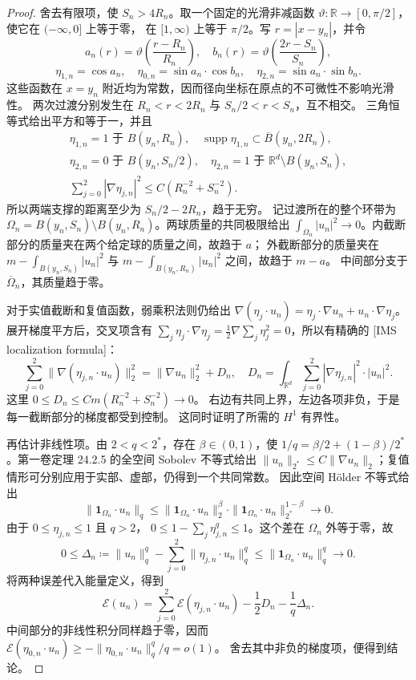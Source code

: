 \begin{proof}
舍去有限项，使 \(S_n>4R_n\)。取一个固定的光滑非减函数
\(\vartheta\colon\mathbb R\to[0,\pi/2]\)，使它在 \((-\infty,0]\) 上等于零，
在 \([1,\infty)\) 上等于 \(\pi/2\)。写 \(r=|x-y_n|\)，并令
\[
 a_n(r)=\vartheta\!\left(\frac{r-R_n}{R_n}\right),\quad
 b_n(r)=\vartheta\!\left(\frac{2r-S_n}{S_n}\right),
\]
\[
 \eta_{1,n}=\cos a_n,\quad
 \eta_{0,n}=\sin a_n\cdot\cos b_n,\quad
 \eta_{2,n}=\sin a_n\cdot\sin b_n.
\]
这些函数在 \(x=y_n\) 附近均为常数，因而径向坐标在原点的不可微性不影响光滑性。
两次过渡分别发生在 \(R_n<r<2R_n\) 与 \(S_n/2<r<S_n\)，互不相交。
三角恒等式给出平方和等于一，并且
\[
 \begin{gathered}
 \eta_{1,n}=1\text{ 于 }B(y_n,R_n),\quad
 \operatorname{supp}\eta_{1,n}\subset\overline B(y_n,2R_n),\\
 \eta_{2,n}=0\text{ 于 }B(y_n,S_n/2),\quad
 \eta_{2,n}=1\text{ 于 }\mathbb R^d\setminus B(y_n,S_n),\\
 \sum_{j=0}^2|\nabla\eta_{j,n}|^2
 \le C(R_n^{-2}+S_n^{-2}).
 \end{gathered}
\]
所以两端支撑的距离至少为 \(S_n/2-2R_n\)，趋于无穷。
记过渡所在的整个环带为
\(\Omega_n=B(y_n,S_n)\setminus B(y_n,R_n)\)。两球质量的共同极限给出
\(\int_{\Omega_n}|u_n|^2\to0\)。内截断部分的质量夹在两个给定球的质量之间，故趋于 \(a\)；
外截断部分的质量夹在 \(m-\int_{B(y_n,S_n)}|u_n|^2\) 与
\(m-\int_{B(y_n,R_n)}|u_n|^2\) 之间，故趋于 \(m-a\)。
中间部分支于 \(\overline\Omega_n\)，其质量趋于零。

对于实值截断和复值函数，弱乘积法则仍给出
\(\nabla(\eta_j\cdot u_n)=\eta_j\cdot\nabla u_n+u_n\cdot\nabla\eta_j\)。
展开梯度平方后，交叉项含有
\(\sum_j\eta_j\cdot\nabla\eta_j
=\tfrac12\nabla\sum_j\eta_j^2=0\)，所以有精确的
[IMS localization formula]：
\begin{equation}
 \sum_{j=0}^2\|\nabla(\eta_{j,n}\cdot u_n)\|_2^2
 =\|\nabla u_n\|_2^2+D_n,\quad
 D_n=\int_{\mathbb R^d}\sum_{j=0}^2
      |\nabla\eta_{j,n}|^2\cdot|u_n|^2.
 \label{b2:eq:F-ims-identity}
\end{equation}
这里
\(0\le D_n\le Cm(R_n^{-2}+S_n^{-2})\to0\)。
右边有共同上界，左边各项非负，于是每一截断部分的梯度都受到控制。
这同时证明了所需的 \(H^1\) 有界性。

再估计非线性项。由 \(2<q<2^*\)，存在 \(\beta\in(0,1)\)，使
\(1/q=\beta/2+(1-\beta)/2^*\)。第一卷定理 24.2.5 的全空间 Sobolev 不等式给出
\(\|u_n\|_{2^*}\le C\|\nabla u_n\|_2\)；复值情形可分别应用于实部、虚部，仍得到一个共同常数。
因此空间 Hölder 不等式给出
\[
 \|\mathbf1_{\Omega_n}\cdot u_n\|_q
 \le
 \|\mathbf1_{\Omega_n}\cdot u_n\|_2^{\beta}
 \cdot\|\mathbf1_{\Omega_n}\cdot u_n\|_{2^*}^{1-\beta}
 \longrightarrow0.
\]
由于 \(0\le\eta_{j,n}\le1\) 且 \(q>2\)，
\(0\le1-\sum_j\eta_{j,n}^q\le1\)。这个差在 \(\Omega_n\) 外等于零，故
\[
 0\le\Delta_n\coloneqq
 \|u_n\|_q^q-\sum_{j=0}^2\|\eta_{j,n}\cdot u_n\|_q^q
 \le\|\mathbf1_{\Omega_n}\cdot u_n\|_q^q\longrightarrow0.
\]
将两种误差代入能量定义，得到
\[
 \mathcal E(u_n)=
 \sum_{j=0}^2\mathcal E(\eta_{j,n}\cdot u_n)
 -\frac12D_n-\frac1q\Delta_n.
\]
中间部分的非线性积分同样趋于零，因而
\(\mathcal E(\eta_{0,n}\cdot u_n)
\ge-\|\eta_{0,n}\cdot u_n\|_q^q/q=o(1)\)。
舍去其中非负的梯度项，便得到结论。
\end{proof}

